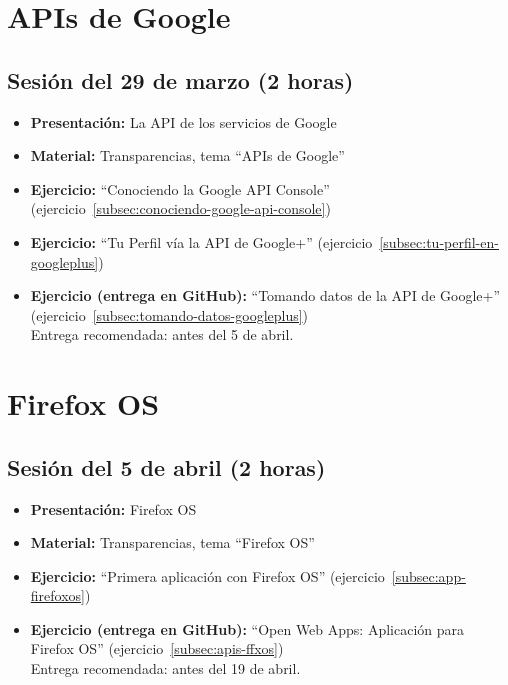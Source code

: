 \documentclass[a4paper,12pt]{report}
\begin{document}
\section{APIs de Google}

\subsection{Sesión del 29 de marzo (2 horas)}

\begin{itemize}
 \item \textbf{Presentación:} La API de los servicios de Google
 \item \textbf{Material:} Transparencias, tema ``APIs de Google''
 \item \textbf{Ejercicio:} ``Conociendo la Google API Console'' (ejercicio~\ref{subsec:conociendo-google-api-console})
  \item \textbf{Ejercicio:} ``Tu Perfil vía la API de Google+'' (ejercicio~\ref{subsec:tu-perfil-en-googleplus})
 \item \textbf{Ejercicio (entrega en GitHub):} ``Tomando datos de la API de Google+'' (ejercicio~\ref{subsec:tomando-datos-googleplus}) 
 \\
Entrega recomendada: antes del 5 de abril.
\end{itemize}


\section{Firefox OS}

\subsection{Sesión del 5 de abril (2 horas)}

\begin{itemize}
 \item \textbf{Presentación:} Firefox OS
 \item \textbf{Material:} Transparencias, tema ``Firefox OS''
 \item \textbf{Ejercicio:} ``Primera aplicación con Firefox OS'' (ejercicio~\ref{subsec:app-firefoxos})
 \item \textbf{Ejercicio (entrega en GitHub):} ``Open Web Apps: Aplicación para Firefox OS'' (ejercicio~\ref{subsec:apis-ffxos}) 
 \\
Entrega recomendada: antes del 19 de abril.
\end{itemize}
\end{document}
